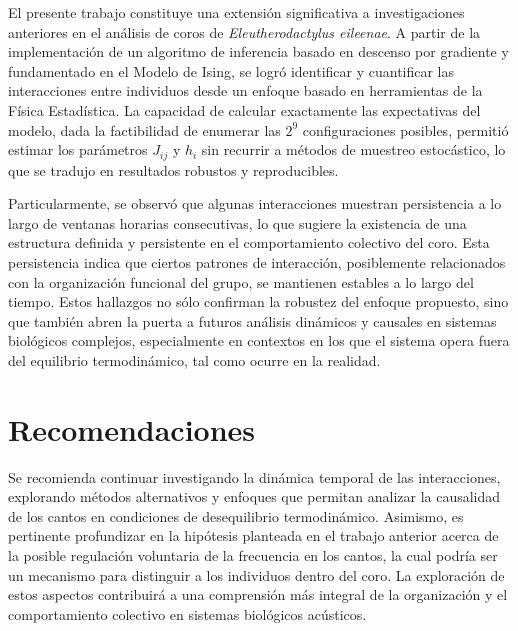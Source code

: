 \documentclass[a4paper,10pt,twocolumn]{article}
\begin{document}
El presente trabajo constituye una extensión significativa a 
investigaciones anteriores en el análisis de coros de 
\emph{Eleutherodactylus eileenae}. A partir de la 
implementación de un algoritmo de inferencia basado en 
descenso por gradiente y fundamentado en el Modelo de Ising, 
se logró identificar y cuantificar las interacciones entre 
individuos desde un enfoque basado en herramientas de la Física 
Estadística. La capacidad de calcular exactamente las 
expectativas del modelo, dada la factibilidad de enumerar las 
\(2^9\) configuraciones posibles, permitió estimar los 
parámetros \( J_{ij} \) y \( h_i \) sin recurrir a métodos de 
muestreo estocástico, lo que se tradujo en resultados robustos 
y reproducibles. 

Particularmente, se observó que algunas interacciones 
muestran persistencia a lo largo de ventanas horarias 
consecutivas, lo que sugiere la existencia de una estructura 
definida y persistente en el comportamiento colectivo del coro. 
Esta persistencia indica que ciertos patrones de interacción, 
posiblemente relacionados con la organización funcional del 
grupo, se mantienen estables a lo largo del tiempo. 
Estos hallazgos no sólo confirman la robustez del enfoque 
propuesto, sino que también abren la puerta a futuros análisis 
dinámicos y causales en sistemas biológicos complejos, 
especialmente en contextos en los que el sistema opera fuera 
del equilibrio termodinámico, tal como ocurre en la realidad.




\section{Recomendaciones}\label{sec:rec}

Se recomienda continuar investigando la dinámica temporal de las interacciones, explorando métodos alternativos y enfoques que permitan analizar la causalidad de los cantos en condiciones de desequilibrio termodinámico. Asimismo, es pertinente profundizar en la hipótesis planteada en el trabajo anterior acerca de la posible regulación voluntaria de la frecuencia en los cantos, la cual podría ser un mecanismo para distinguir a los individuos dentro del coro. La exploración de estos aspectos contribuirá a una comprensión más integral de la organización y el comportamiento colectivo en sistemas biológicos acústicos.
\end{document}
